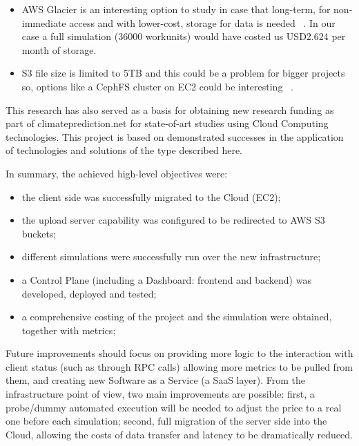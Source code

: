 \documentclass[journal abbreviation, manuscript]{copernicus}
\begin{document}
\begin{conclusions}
\begin{itemize}
 \item AWS Glacier is an interesting option to study in case that long-term, for non-immediate access and with lower-cost, storage for data is needed ~\citep{AWSGlacier}. In our case a full simulation (36000 workunits) would have costed us USD2.624 per month of storage.  
 \item S3 file size is limited to 5TB and this could be a problem for bigger projects so, options like a CephFS cluster on EC2 could be interesting ~\citep{zhao2015}.

\end{itemize}

This research has also served as a basis for obtaining new research funding as part of climateprediction.net for state-of-art studies using Cloud Computing technologies. This project is based on demonstrated successes in the application of technologies and solutions of the type described here.

In summary, the achieved high-level objectives were:
\begin{itemize}
 \item the client side was successfully migrated to the Cloud (EC2);

 \item the upload server capability was configured to be redirected to AWS S3 buckets;

 \item different simulations were successfully run over the new infrastructure;

 \item a Control Plane (including a Dashboard: frontend and backend) was developed, deployed and tested;

 \item a comprehensive costing of the project and the simulation were obtained, together with metrics;
\end{itemize}

Future improvements should focus on providing more logic to the interaction with client status (such as through RPC calls) allowing more metrics to be pulled from them, and creating new Software as a Service (a SaaS layer). From the infrastructure point of view, two main improvements are possible: first, a probe/dummy automated execution will be needed to adjust the price to a real one before each simulation; second, full migration of the server side into the Cloud, allowing the costs of data transfer and latency to be dramatically reduced.

\hfill \break
\end{conclusions}
\end{document}
